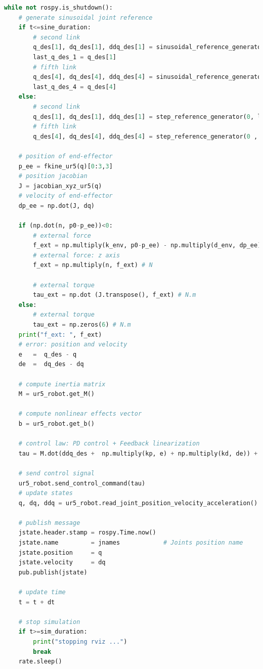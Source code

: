 \begin{lstlisting}[language=Python,caption={Move the second and fifth joint of UR5 robot with the required movement of activity 2.7.1.}, label={lst:inverse_dynamics_unilateral_compliant_contact}]
while not rospy.is_shutdown():
    # generate sinusoidal joint reference
    if t<=sine_duration:
        # second link
        q_des[1], dq_des[1], ddq_des[1] = sinusoidal_reference_generator(q0[1], 0.2, 1, t)
        last_q_des_1 = q_des[1]
        # fifth link
        q_des[4], dq_des[4], ddq_des[4] = sinusoidal_reference_generator(q0[4], 0.4, 1.5, t)  
        last_q_des_4 = q_des[4]  
    else:
        # second link
        q_des[1], dq_des[1], ddq_des[1] = step_reference_generator(0, last_q_des_1)
        # fifth link
        q_des[4], dq_des[4], ddq_des[4] = step_reference_generator(0 , last_q_des_4)

    # position of end-effector
    p_ee = fkine_ur5(q)[0:3,3]
    # position jacobian
    J = jacobian_xyz_ur5(q)    
    # velocity of end-effector
    dp_ee = np.dot(J, dq)

    if (np.dot(n, p0-p_ee))<0:
        # external force
        f_ext = np.multiply(k_env, p0-p_ee) - np.multiply(d_env, dp_ee) # N
        # external force: z axis
        f_ext = np.multiply(n, f_ext) # N

        # external torque 
        tau_ext = np.dot (J.transpose(), f_ext) # N.m
    else:
        # external torque 
        tau_ext = np.zeros(6) # N.m
    print("f_ext: ", f_ext)
    # error: position and velocity
    e 	=  q_des - q
    de 	=  dq_des - dq    

    # compute inertia matrix
    M = ur5_robot.get_M()

    # compute nonlinear effects vector
    b = ur5_robot.get_b()   

    # control law: PD control + Feedback linearization
    tau = M.dot(ddq_des +  np.multiply(kp, e) + np.multiply(kd, de)) + b + tau_ext
    
    # send control signal   
    ur5_robot.send_control_command(tau)
    # update states
    q, dq, ddq = ur5_robot.read_joint_position_velocity_acceleration()

    # publish message
    jstate.header.stamp = rospy.Time.now()
    jstate.name 		= jnames			# Joints position name
    jstate.position 	= q
    jstate.velocity 	= dq
    pub.publish(jstate)

    # update time
    t = t + dt   

    # stop simulation
    if t>=sim_duration:
        print("stopping rviz ...")
        break
    rate.sleep()
\end{lstlisting}

